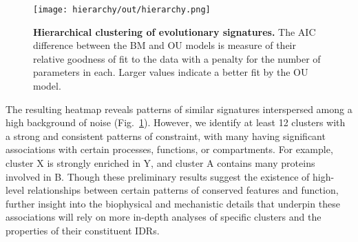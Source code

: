 \begin{figure}[h!]
\texttt{[image: hierarchy/out/hierarchy.png]}
\centering
\caption{\textbf{Hierarchical clustering of evolutionary signatures.}
The AIC difference between the BM and OU models is measure of their relative goodness of fit to the data with a penalty for the number of parameters in each. Larger values indicate a better fit by the OU model.}
\label{fig:hierarchy}
\end{figure}

The resulting heatmap reveals patterns of similar signatures interspersed among a high background of noise (Fig.~\ref{fig:hierarchy}). However, we identify at least 12 clusters with a strong and consistent patterns of constraint, with many having significant associations with certain processes, functions, or compartments. For example, cluster X is strongly enriched in Y, and cluster A contains many proteins involved in B. Though these preliminary results suggest the existence of high-level relationships between certain patterns of conserved features and function, further insight into the biophysical and mechanistic details that underpin these associations will rely on more in-depth analyses of specific clusters and the properties of their constituent IDRs.


